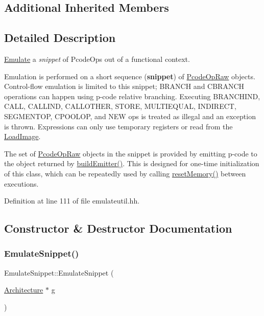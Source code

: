 \subsection*{Additional Inherited Members}


\subsection{Detailed Description}
\mbox{\hyperlink{class_emulate}{Emulate}} a {\itshape snippet} of Pcode\+Ops out of a functional context. 

Emulation is performed on a short sequence ({\bfseries{snippet}}) of \mbox{\hyperlink{class_pcode_op_raw}{Pcode\+Op\+Raw}} objects. Control-\/flow emulation is limited to this snippet; B\+R\+A\+N\+CH and C\+B\+R\+A\+N\+CH operations can happen using p-\/code relative branching. Executing B\+R\+A\+N\+C\+H\+I\+ND, C\+A\+LL, C\+A\+L\+L\+I\+ND, C\+A\+L\+L\+O\+T\+H\+ER, S\+T\+O\+RE, M\+U\+L\+T\+I\+E\+Q\+U\+AL, I\+N\+D\+I\+R\+E\+CT, S\+E\+G\+M\+E\+N\+T\+OP, C\+P\+O\+O\+L\+OP, and N\+EW ops is treated as illegal and an exception is thrown. Expressions can only use temporary registers or read from the \mbox{\hyperlink{class_load_image}{Load\+Image}}.

The set of \mbox{\hyperlink{class_pcode_op_raw}{Pcode\+Op\+Raw}} objects in the snippet is provided by emitting p-\/code to the object returned by \mbox{\hyperlink{class_emulate_snippet_ad45023c5e4a7170496ef8acc48835d32}{build\+Emitter()}}. This is designed for one-\/time initialization of this class, which can be repeatedly used by calling \mbox{\hyperlink{class_emulate_snippet_a243812d9450f7d70610e23924def533f}{reset\+Memory()}} between executions. 

Definition at line 111 of file emulateutil.\+hh.



\subsection{Constructor \& Destructor Documentation}
\mbox{\label{class_emulate_snippet_ad9f38ff5be18035f04b0ced7451ab0d4}} 
\subsubsection{\texorpdfstring{EmulateSnippet()}{EmulateSnippet()}}
{\footnotesize\ttfamily Emulate\+Snippet\+::\+Emulate\+Snippet (\begin{DoxyParamCaption}\item[{\mbox{\hyperlink{class_architecture}{Architecture}} $\ast$}]{g }\end{DoxyParamCaption})\hspace{0.3cm}{\ttfamily [inline]}}



